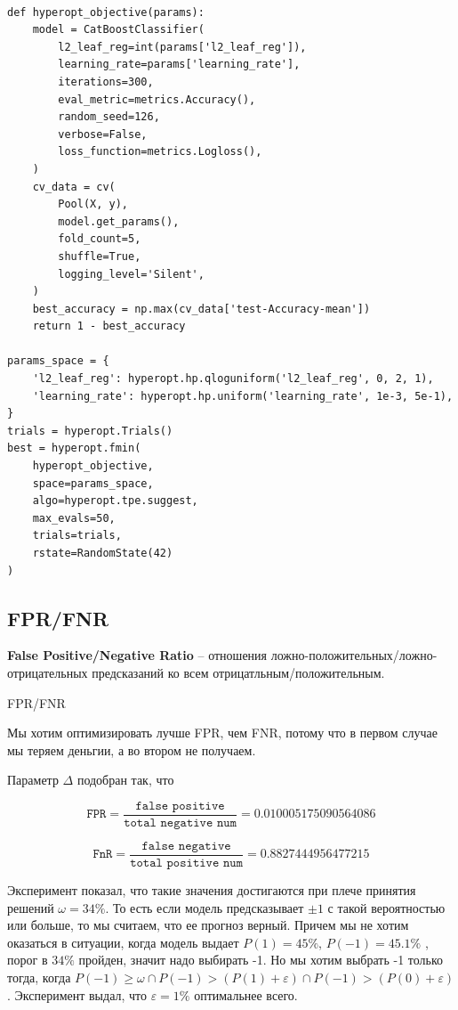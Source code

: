 \begin{verbatim}

def hyperopt_objective(params):
    model = CatBoostClassifier(
        l2_leaf_reg=int(params['l2_leaf_reg']),
        learning_rate=params['learning_rate'],
        iterations=300,
        eval_metric=metrics.Accuracy(),
        random_seed=126,
        verbose=False,
        loss_function=metrics.Logloss(),
    )
    cv_data = cv(
        Pool(X, y),
        model.get_params(),
        fold_count=5,
        shuffle=True,
        logging_level='Silent',
    )
    best_accuracy = np.max(cv_data['test-Accuracy-mean'])
    return 1 - best_accuracy

params_space = {
    'l2_leaf_reg': hyperopt.hp.qloguniform('l2_leaf_reg', 0, 2, 1),
    'learning_rate': hyperopt.hp.uniform('learning_rate', 1e-3, 5e-1),
}
trials = hyperopt.Trials()
best = hyperopt.fmin(
    hyperopt_objective,
    space=params_space,
    algo=hyperopt.tpe.suggest,
    max_evals=50,
    trials=trials,
    rstate=RandomState(42)
)

\end{verbatim}

\subsection{FPR/FNR}

 \textbf{False Positive/Negative Ratio} -- отношения ложно-положительных/ложно-отрицательных предсказаний ко всем отрицатльным/положительным.

\designation FPR/FNR

Мы хотим оптимизировать лучше FPR, чем FNR, потому что в первом случае мы теряем деньгии, а во втором не получаем.

Параметр $\Delta$ подобран так, что

$$\texttt{FPR} = \frac{\texttt{false positive}}{\texttt{total negative num}} = 0.010005175090564086$$

$$\texttt{FnR} = \frac{\texttt{false negative}}{\texttt{total positive num}} = 0.8827444956477215$$

Эксперимент показал, что такие значения достигаются при плече принятия решений $\omega = 34\%$. То есть если модель предсказывает $\pm 1$ с такой вероятностью или больше, то мы считаем, что ее прогноз верный. Причем мы не хотим оказаться в ситуации, когда модель выдает $P(1) = 45\%$, $P(-1) = 45.1\%$ , порог в $34\%$ пройден, значит надо выбирать -1. Но мы хотим выбрать -1 только тогда, когда $P(-1) \geqslant \omega \cap P(-1) > (P(1) + \varepsilon) \cap P(-1) > (P(0) + \varepsilon)$. Эксперимент выдал, что $\varepsilon = 1\%$ оптимальнее всего.

